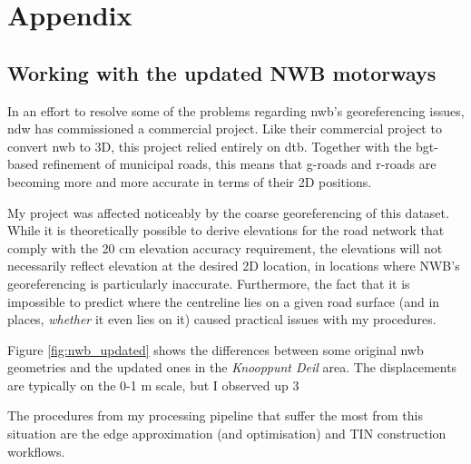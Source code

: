 
\chapter{Appendix}
\label{chap:app}

\section{Working with the updated NWB motorways}
\label{sec:nwb_updated}

In an effort to resolve some of the problems regarding \ac{nwb}'s georeferencing issues, \ac{ndw} has commissioned a commercial project. Like their commercial project to convert \ac{nwb} to 3D, this project relied entirely on \ac{dtb}. Together with the \ac{bgt}-based refinement of municipal roads, this means that \ac{g-roads} and \ac{r-roads} are becoming more and more accurate in terms of their 2D positions.

My project was affected noticeably by the coarse georeferencing of this dataset. While it is theoretically possible to derive elevations for the road network that comply with the 20 cm elevation accuracy requirement, the elevations will not necessarily reflect elevation at the desired 2D location, in locations where \ac{NWB}'s georeferencing is particularly inaccurate. Furthermore, the fact that it is impossible to predict where the centreline lies on a given road surface (and in places, \textit{whether} it even lies on it) caused practical issues with my procedures.

Figure \ref{fig:nwb_updated} shows the differences between some original \ac{nwb} geometries and the updated ones in the \textit{Knooppunt Deil} area. The displacements are typically on the 0-1 m scale, but I observed up 3 

The procedures from my processing pipeline that suffer the most from this situation are the edge approximation (and optimisation) and TIN construction workflows.